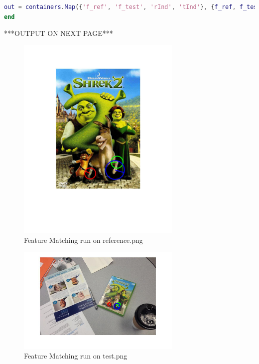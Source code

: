 \documentclass{csc_assignment4}
\begin{document}
\begin{description}
\begin{enumerate}[label=(\alph*)]
\begin{lstlisting}[language=MATLAB]
% Return map with frames and key feature indices
out = containers.Map({'f_ref', 'f_test', 'rInd', 'tInd'}, {f_ref, f_test, [indices(1), indices(2), indices(3)],[top(indices(1)), top(indices(2)), top(indices(3))]})
end
\end{lstlisting}
***OUTPUT ON NEXT PAGE***
\begin{figure}
\vspace{-20mm}
\includegraphics[width=0.7\textwidth, center]{reference_matching.jpg}
\vspace*{-40mm}
\caption{Feature Matching run on reference.png}
\end{figure}
\begin{figure}
\includegraphics[width=0.7\textwidth, center]{test_matching.jpg}
\vspace{-15mm}
\caption{Feature Matching run on test.png}
\end{figure}
\begin{figure}

\end{figure}
\end{enumerate}
\end{description}
\end{document}
